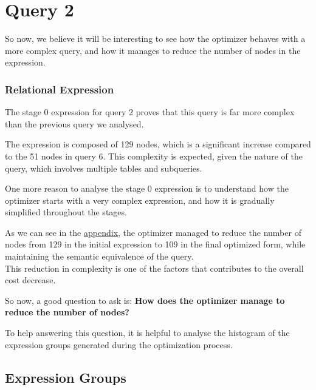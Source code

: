 \documentclass[a4paper,12pt]{scrreprt}
\begin{document}
\section{Query 2}

So now, we believe it will be interesting to see how the optimizer behaves with a more complex query, and how it manages to reduce the number of nodes in the expression. 

\subsubsection{Relational Expression}

The stage 0 expression for query 2 proves that this query is far more complex than the previous query we analysed.

The expression is composed of 129 nodes, which is a significant increase compared to the 51 nodes in query 6. This complexity is expected, given the nature of the query, which involves multiple tables and subqueries. 

One more reason to analyse the stage 0 expression is to understand how the optimizer starts with a very complex expression, and how it is gradually simplified throughout the stages. 


As we can see in the \underline{\hyperref[subsec:query2]{appendix}}, the optimizer managed to reduce the number of nodes from 129 in the initial expression to 109 in the final optimized form, while maintaining the semantic equivalence of the query. \\ This reduction in complexity is one of the factors that contributes to the overall cost decrease. 

So now, a good question to ask is: \textbf{How does the optimizer manage to reduce the number of nodes?} 

To help answering this question, it is helpful to analyse the histogram of the expression groups generated during the optimization process. 

\subsection{Expression Groups}
\end{document}

